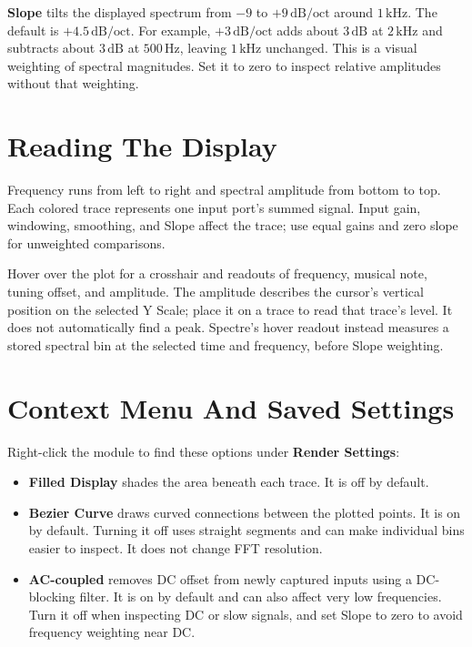 \documentclass[12pt,letterpaper]{article}
\begin{document}
\textbf{Slope} tilts the displayed spectrum from $-9$ to
$+9\,\mathrm{dB/oct}$ around $1\,\mathrm{kHz}$. The default is
\textbf{$+4.5\,\mathrm{dB/oct}$}. For example, $+3\,\mathrm{dB/oct}$ adds
about $3\,\mathrm{dB}$ at $2\,\mathrm{kHz}$ and subtracts about
$3\,\mathrm{dB}$ at $500\,\mathrm{Hz}$, leaving $1\,\mathrm{kHz}$ unchanged.
This is a visual weighting of spectral magnitudes. Set it to zero to inspect
relative amplitudes without that weighting.

\clearpage
\section{Reading The Display}

Frequency runs from left to right and spectral amplitude from bottom to top.
Each colored trace represents one input port's summed signal. Input gain,
windowing, smoothing, and Slope affect the trace; use equal gains and zero
slope for unweighted comparisons.

Hover over the plot for a crosshair and readouts of frequency, musical note,
tuning offset, and amplitude. The amplitude describes the cursor's vertical
position on the selected Y Scale; place it on a trace to read that trace's
level. It does not automatically find a peak. Spectre's hover readout instead
measures a stored spectral bin at the selected time and frequency, before
Slope weighting.

\section{Context Menu And Saved Settings}

Right-click the module to find these options under \textbf{Render Settings}:
\begin{itemize}
  \item \textbf{Filled Display} shades the area beneath each trace. It is
  off by default.
  \item \textbf{Bezier Curve} draws curved connections between the plotted
  points. It is on by default. Turning it off uses straight segments and can
  make individual bins easier to inspect. It does not change FFT resolution.
  \item \textbf{AC-coupled} removes DC offset from newly captured inputs
  using a DC-blocking filter. It is on by default and can also affect very
  low frequencies. Turn it off when inspecting DC or slow signals, and set
  Slope to zero to avoid frequency weighting near DC.
\end{itemize}
\end{document}
